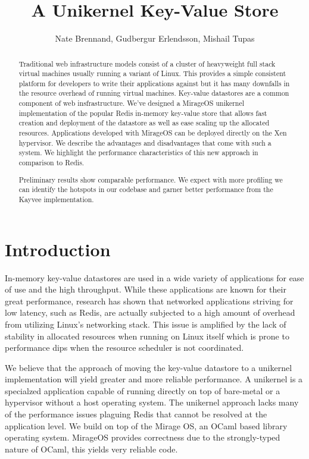 \documentclass[english,10pt,twocolumn]{article}
\begin{document}
\title{A Unikernel Key-Value Store}
\author{Nate Brennand, Gudbergur Erlendsson, Mishail Tupas}
\date{}
\maketitle
\thispagestyle{empty}


\begin{abstract}
Traditional web infrastructure models consist of a cluster of heavyweight full stack virtual machines usually running a variant of Linux.
This provides a simple consistent platform for developers to write their applications against but it has many downfalls in the resource overhead of running virtual machines.
Key-value datastores are a common component of web insfrastructure.
We've designed a MirageOS\cite{mirage} unikernel implementation of the popular Redis\cite{redis} in-memory key-value store that allows fast creation and deployment of the datastore as well as ease scaling up the allocated resources.
Applications developed with MirageOS can be deployed directly on the Xen hypervisor.
We describe the advantages and disadvantages that come with such a system.
We highlight the performance characteristics of this new approach in comparison to Redis.

Preliminary results show comparable performance.
We expect with more profiling we can identify the hotspots in our codebase and garner better performance from the Kayvee implementation.
\end{abstract}


\section{Introduction}
In-memory key-value datastores are used in a wide variety of applications for ease of use and the high throughput.
While these applications are known for their great performance, research has shown that networked applications striving for low latency, such as Redis, are actually subjected to a high amount of overhead from utilizing Linux's networking stack.\cite{arrakis}
This issue is amplified by the lack of stability in allocated resources when running on Linux itself which is prone to performance dips when the resource scheduler is not coordinated.

We believe that the approach of moving the key-value datastore to a unikernel implementation will yield greater and more reliable performance.
A unikernel is a specialzed application capable of running directly on top of bare-metal or a hypervisor without a host operating system.
The unikernel approach lacks many of the performance issues plaguing Redis that cannot be resolved at the application level.
We build on top of the Mirage OS\cite{mirage}, an OCaml based library operating system.
MirageOS provides correctness due to the strongly-typed nature of OCaml, this yields very reliable code.
\end{document}
